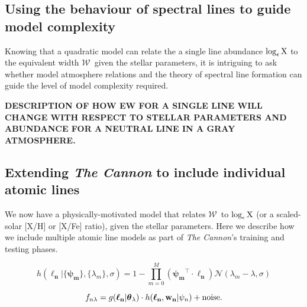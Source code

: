 \documentclass[useAMS,usenatbib]{mn2e}
\newcommand\tc{\textit{The Cannon}}
\newcommand\lv{\mathbf{\boldsymbol\ell_n}}
\newcommand\cv{{\boldsymbol\theta}_\lambda}
\newcommand\wv{\mathbf{w_n}}
\newcommand\given{|}
\newcommand{\logeps}[1]{\log_{\epsilon}{\rm #1}}
\newcommand\ew{$\mathcal{W}$}
\newcommand\psiv{\mathbf{\boldsymbol{\psi}_m}}
\begin{document}
\subsection{Using the behaviour of spectral lines to guide model complexity}

Knowing that a quadratic model can relate the a single line abundance 
$\logeps{X}$ to the equivalent width \ew\, given the stellar
parameters, it is intriguing to ask whether model atmosphere relations and
the theory of spectral line formation can guide the level of model complexity
required.





\textbf{DESCRIPTION OF HOW EW FOR A SINGLE LINE WILL CHANGE WITH RESPECT TO STELLAR PARAMETERS AND ABUNDANCE FOR A NEUTRAL LINE IN A GRAY ATMOSPHERE.}


\subsection{Extending \tc{} to include individual atomic lines}

We now have a physically-motivated model that relates \ew\ to $\logeps{X}$
(or a scaled-solar [X/H] or [X/Fe] ratio), given the stellar parameters. Here we
describe how we include multiple atomic line models as part of \tc's training
and testing phases. 




\begin{equation}
h(\lv\given\{\psiv\},\{\lambda_m\},\sigma) = 1 - \prod^{M}_{m=0}(\psiv^\intercal\cdot\lv)\mathcal{N}(\lambda_m - \lambda,\sigma)
\end{equation}




\begin{equation}
    f_{n\lambda} = g(\lv\given\cv) \cdot h(\lv,\wv\given\psi_n) +  {\rm noise}.
\end{equation}
\end{document}
